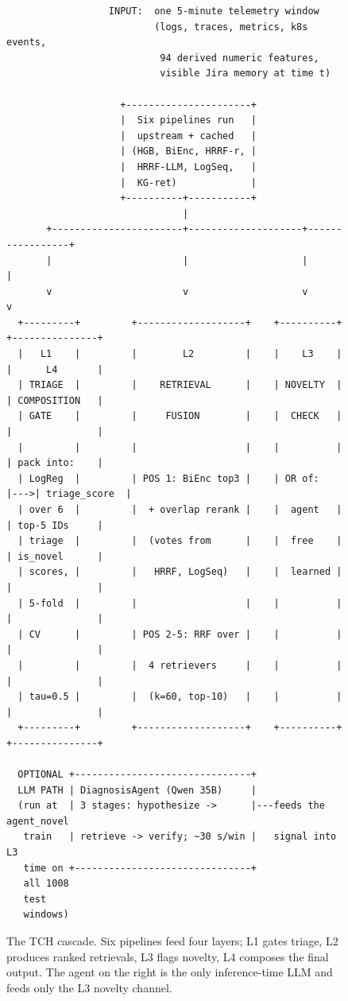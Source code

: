 \begin{figure}[h]
\centering
\begin{minipage}{0.97\linewidth}
\small
\begin{verbatim}
                  INPUT:  one 5-minute telemetry window
                          (logs, traces, metrics, k8s events,
                           94 derived numeric features,
                           visible Jira memory at time t)

                    +----------------------+
                    |  Six pipelines run   |
                    |  upstream + cached   |
                    | (HGB, BiEnc, HRRF-r, |
                    |  HRRF-LLM, LogSeq,   |
                    |  KG-ret)             |
                    +----------+-----------+
                               |
       +-----------------------+--------------------+-----------------+
       |                       |                    |                 |
       v                       v                    v                 v
  +---------+         +-------------------+    +----------+    +---------------+
  |   L1    |         |        L2         |    |    L3    |    |      L4       |
  | TRIAGE  |         |    RETRIEVAL      |    | NOVELTY  |    | COMPOSITION   |
  | GATE    |         |     FUSION        |    |  CHECK   |    |               |
  |         |         |                   |    |          |    | pack into:    |
  | LogReg  |         | POS 1: BiEnc top3 |    | OR of:   |--->| triage_score  |
  | over 6  |         |  + overlap rerank |    |  agent   |    | top-5 IDs     |
  | triage  |         |  (votes from      |    |  free    |    | is_novel      |
  | scores, |         |   HRRF, LogSeq)   |    |  learned |    |               |
  | 5-fold  |         |                   |    |          |    |               |
  | CV      |         | POS 2-5: RRF over |    |          |    |               |
  |         |         |  4 retrievers     |    |          |    |               |
  | tau=0.5 |         |  (k=60, top-10)   |    |          |    |               |
  +---------+         +-------------------+    +----------+    +---------------+

  OPTIONAL +-------------------------------+
  LLM PATH | DiagnosisAgent (Qwen 35B)     |
  (run at  | 3 stages: hypothesize ->      |---feeds the agent_novel
   train   | retrieve -> verify; ~30 s/win |   signal into L3
   time on +-------------------------------+
   all 1008
   test
   windows)
\end{verbatim}
\end{minipage}
\caption{The TCH cascade. Six pipelines feed four layers; L1 gates triage, L2 produces ranked retrievals, L3 flags novelty, L4 composes the final output. The agent on the right is the only inference-time LLM and feeds only the L3 novelty channel.}
\label{fig:tch-arch}
\end{figure}

